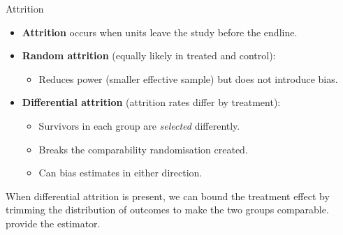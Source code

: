 \documentclass[aspectratio=169, 11pt]{beamer}
\begin{document}
\begin{frame}[t]{Attrition}
\begin{itemize}
  \setlength\itemsep{0.5em}
  \item \textbf{Attrition} occurs when units leave the study before the endline.
  \item \textbf{Random attrition} (equally likely in treated and control):
    \begin{itemize}
      \item Reduces power (smaller effective sample) but does not introduce bias.
    \end{itemize}
  \item \textbf{Differential attrition} (attrition rates differ by treatment):
    \begin{itemize}
      \item Survivors in each group are \emph{selected} differently.
      \item Breaks the comparability randomisation created.
      \item Can bias estimates in either direction.
    \end{itemize}
\end{itemize}
\vspace{0.3em}
\begin{keybox}
When differential attrition is present, we can bound the treatment effect
by trimming the distribution of outcomes to make the two groups comparable.
\citet{AngristPischke2009} provide the estimator.
\end{keybox}
\end{frame}
\end{document}
